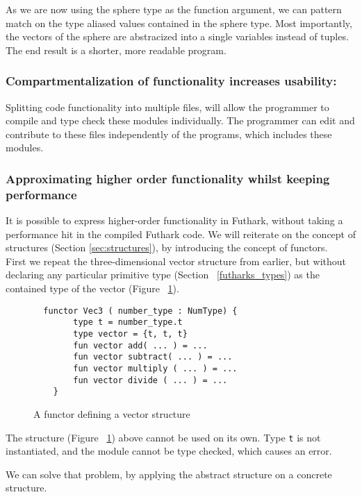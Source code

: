 \noindent As we are now using the sphere type as the function argument, we can pattern
match on the type aliased values contained in the sphere type.
Most importantly, the vectors of the sphere are abstracized into a single variables
instead of tuples.
\\
The end result is a shorter, more readable program.

\subsubsection{Compartmentalization of functionality increases usability:}
Splitting code functionality into multiple files, will allow the programmer to
compile and type check these modules individually. The programmer can edit and
contribute to these files independently of the programs, which includes these
modules.

\subsubsection{Approximating higher order functionality whilst keeping performance}
\label{subsec:higherorderfunctionality}
It is possible to express higher-order functionality in Futhark, without taking
a performance hit in the compiled Futhark code.
We will reiterate on the concept of structures (Section \ref{sec:structures}), by introducing
the concept of functors.\\
First we repeat the three-dimensional vector structure
from earlier, but without declaring any particular
primitive type (Section ~\ref{futharks_types}) as the contained type of the vector (Figure ~\ref{struct_vec3}).
\begin{figure}
  \begin{verbatim}
  functor Vec3 ( number_type : NumType) { 
        type t = number_type.t
        type vector = {t, t, t}
        fun vector add( ... ) = ...
        fun vector subtract( ... ) = ...
        fun vector multiply ( ... ) = ...
        fun vector divide ( ... ) = ...
    }
  \end{verbatim}
  \caption{A functor defining a vector structure \label{struct_vec3}}
\end{figure}

The structure (Figure ~\ref{struct_vec3}) above cannot be used on its own. Type \texttt{t} is not
instantiated, and the module cannot be type checked, which causes an error.


We can solve that problem, by applying the abstract structure on a concrete
structure.

